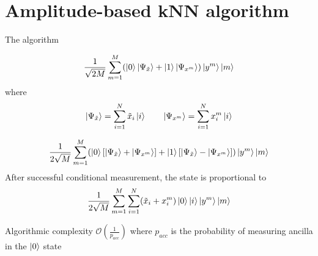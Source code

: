 \documentclass[10pt]{beamer}
\begin{document}
\section{Amplitude-based kNN algorithm}
{
\begin{frame}{The algorithm}

\begin{equation}
\frac{1}{\sqrt{2M}}\sum_{m=1}^{M} (\ket{0}\ket{\Psi_{\tilde{x}}}+\ket{1}\ket{\Psi_{x^{m}}})\ket{y^{m}}\ket{m}
\end{equation}
where
\begin{equation}
\ket{\Psi_{\tilde{x}}} = \sum_{i=1}^{N} \tilde{x}_i\ket{i} \quad \quad
\ket{\Psi_{x^{m}}} = \sum_{i=1}^{N} x_i^m \ket{i}
\end{equation}

\begin{equation}
\frac{1}{2\sqrt{M}}\sum_{m=1}^{M} (\ket{0}[\ket{\Psi_{\tilde{x}}}+\ket{\Psi_{x^{m}}}]+\ket{1}[\ket{\Psi_{\tilde{x}}}-\ket{\Psi_{x^{m}}}])\ket{y^{m}}\ket{m}
\end{equation}
After successful conditional measurement, the state is proportional to
\begin{equation}
\frac{1}{2\sqrt{M}}\sum_{m=1}^{M} \sum_{i=1}^{N} (\tilde{x}_i+x_i^m)\ket{0}\ket{i}\ket{y^{m}}\ket{m}
\end{equation}
	
	\begin{alertblock}{Algorithmic complexity}
	\centering
	$\mathcal{O}(\frac{1}{p_{acc}})$ where $p_{acc}$ is the probability of measuring ancilla in the $\ket{0}$ state
	\end{alertblock}
\end{frame}
}
\end{document}
